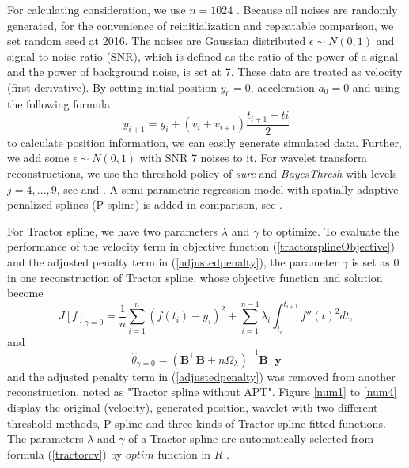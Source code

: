 For calculating consideration, we use $n=1024$ \cite{nason2010wavelet}. Because all noises are randomly generated, for the convenience of reinitialization and repeatable comparison, we set random seed at 2016. The noises are \iid Gaussian distributed $\epsilon \sim N(0,1)$ and signal-to-noise ratio (SNR), which is defined as the ratio of the power of a signal and the power of background noise, is set at 7. These data are treated as velocity (first derivative). By setting initial position $y_0=0$, acceleration $a_0=0$ and using the following formula 
\begin{equation}\label{generateVelocity}
y_{i+1}=y_i+(v_i+v_{i+1})\frac{t_{i+1}-ti}{2}
\end{equation}
to calculate position information, we can easily generate simulated data. Further, we add some \iid $\epsilon \sim N(0,1)$ with SNR 7 noises to it. For wavelet transform reconstructions, we use the threshold policy of \textit{sure} and \textit{BayesThresh} with levels $j=4, \ldots, 9$, see  \cite{donoho1995adapting} and \cite{abramovich1998wavelet}. A semi-parametric regression model with spatially adaptive penalized splines (P-spline) is added in comparison, see \cite{krivobokova2008fast} \cite{ruppert2003semiparametric}.

For Tractor spline, we have two parameters $\lambda$ and $\gamma$ to optimize. To evaluate the performance of the velocity term in objective function (\ref{tractorsplineObjective}) and the adjusted penalty term in (\ref{adjustedpenalty}), the parameter $\gamma$ is set as 0 in one reconstruction of Tractor spline, whose objective function and solution become
\begin{equation}\label{ofgamma0}
J[f]_{\gamma=0}= \frac{1}{n} \sum_{i=1}^{n} (f(t_i)-y_i)^2 +\sum_{i=1}^{n-1} \lambda_i\int_{t_i}^{t_{i+1}} f''(t)^2 dt,
\end{equation}
and
\begin{equation}\label{thetahat0}
\hat{\theta}_{\gamma=0}=(\mathbf{B}^\top\mathbf{B}+n\Omega_{\lambda})^{-1}\mathbf{B}^\top\mathbf{y}
\end{equation}
and the adjusted penalty term in (\ref{adjustedpenalty}) was removed from another reconstruction, noted as "Tractor spline without APT". Figure \ref{num1} to \ref{num4} display the original (velocity), generated position, wavelet with two different threshold methods, P-spline and three kinds of Tractor spline fitted functions. The parameters $\lambda$ and $\gamma$ of a Tractor spline are automatically selected from formula (\ref{tractorcv}) by $\textit{optim}$ function in $R$ \cite{nelder1965simplex}.


